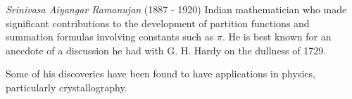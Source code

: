 \documentclass[12pt]{article}
\begin{document}
\emph{Srinivasa Aiyangar Ramanujan} (1887 - 1920) Indian mathematician who made significant contributions to the development of partition functions and summation formulas involving constants such as $\pi$. He is best known for an anecdote of a discussion he had with G. H. Hardy on the dullness of 1729.

Some of his discoveries have been found to have applications in physics, particularly crystallography.
\end{document}
